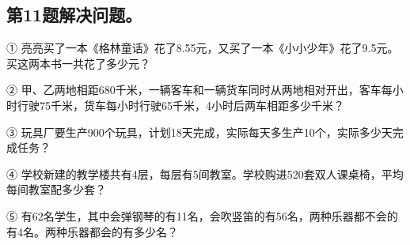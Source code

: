 \subsection*{第11题\quad 解决问题。}
\noindent ① 亮亮买了一本《格林童话》花了8.55元，又买了一本《小小少年》花了9.5元。买这两本书一共花了多少元？\par
{}
\noindent ② 甲、乙两地相距680千米，一辆客车和一辆货车同时从两地相对开出，客车每小时行驶75千米，货车每小时行驶65千米，4小时后两车相距多少千米？\par
{}
\noindent ③ 玩具厂要生产900个玩具，计划18天完成，实际每天多生产10个，实际多少天完成任务？\par
{}
\noindent ④ 学校新建的教学楼共有4层，每层有5间教室。学校购进520套双人课桌椅，平均每间教室配多少套？\par
{}
\noindent ⑤ 有62名学生，其中会弹钢琴的有11名，会吹竖笛的有56名，两种乐器都不会的有4名。两种乐器都会的有多少名？\par
{}
